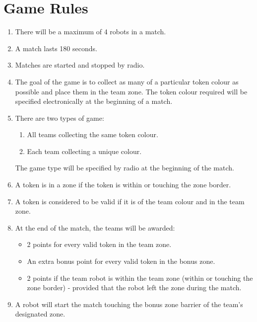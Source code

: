 \section {Game Rules}
\label{game-rules}

\begin{enumerate}

\item There will be a maximum of 4 robots in a match.
\item A match lasts 180 seconds.
\item Matches are started and stopped by radio.
\item The goal of the game is to collect as many of a particular token colour as possible and place them in the team zone.  The token colour required will be specified electronically at the beginning of a match.
\item There are two types of game:
  \renewcommand{\labelenumii}{\arabic{enumii}.}
  \begin{enumerate}
  \item All teams collecting the same token colour.
  \item Each team collecting a unique colour. 
  \end{enumerate}
The game type will be specified by radio at the beginning of the match.
\item A token is in a zone if the token is within or touching the zone border.
\item A token is considered to be valid if it is of the team colour and in the team zone.
\item At the end of the match, the teams will be awarded:
  \begin{itemize}
  \item 2 points for every valid token in the team zone.
  \item An extra bonus point for every valid token in the bonus zone.
  \item 2 points if the team robot is within the team zone (within or touching the zone border) - provided that the robot left the zone during the match.
  \end{itemize}
\item A robot will start the match touching the bonus zone barrier of the team's designated zone.
\end{enumerate}